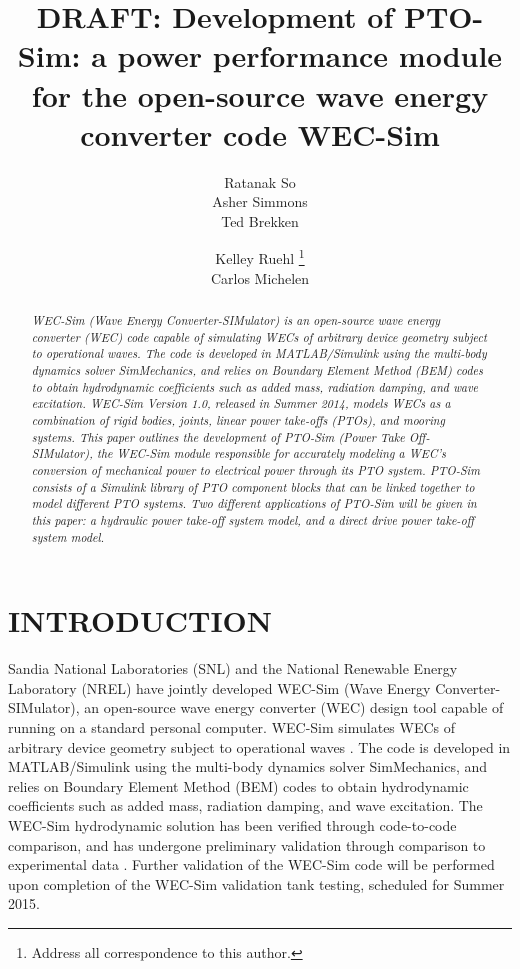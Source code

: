 \documentclass[twocolumn,10pt]{asme2e}
\title{DRAFT: Development of PTO-Sim: a power performance module for the open-source wave energy converter code WEC-Sim}
\author{Ratanak So\\
       {\tensfb Asher Simmons}   \\
       {\tensfb Ted Brekken}   
    \affiliation{
	School of Electrical Engineering and Computer Science\\
	Oregon State University\\
	Corvallis, Oregon USA\\
    }	
}
\author{Kelley Ruehl \thanks{Address all correspondence to this author.} \\
       {\tensfb Carlos Michelen}     
    \affiliation{Water Power Department \\
    	Sandia National Laboratories\\
	Albuquerque, NM USA\\
	Email: kelley.ruehl@sandia.gov
    }
}
\begin{document}
\maketitle    


\begin{abstract}
{\it 
WEC-Sim (Wave Energy Converter-SIMulator) is an open-source wave energy converter (WEC) code capable of simulating WECs of arbitrary device geometry subject to operational waves. The code is developed in MATLAB/Simulink using the multi-body dynamics solver SimMechanics, and relies on Boundary Element Method (BEM) codes to obtain hydrodynamic coefficients such as added mass, radiation damping, and wave excitation. WEC-Sim Version 1.0, released in Summer 2014, models WECs as a combination of rigid bodies, joints, linear power take-offs (PTOs), and mooring systems. This paper outlines the development of PTO-Sim (Power Take Off-SIMulator), the WEC-Sim module responsible for accurately modeling a WEC's conversion of mechanical power to electrical power through its PTO system. PTO-Sim consists of a Simulink library of PTO component blocks that can be linked together to model different PTO systems. Two different applications of PTO-Sim will be given in this paper: a hydraulic power take-off system model, and a direct drive power take-off system model.
}
\end{abstract}


\section*{INTRODUCTION}

Sandia National Laboratories (SNL) and the National Renewable Energy Laboratory (NREL) have jointly developed WEC-Sim (Wave Energy Converter-SIMulator), an open-source wave energy converter (WEC) design tool capable of running on a standard personal computer. WEC-Sim  simulates WECs of arbitrary device geometry subject to operational waves \cite{wecsim}. The code is developed in MATLAB/Simulink using the multi-body dynamics solver SimMechanics, and relies on Boundary Element Method (BEM) codes to obtain hydrodynamic coefficients such as added mass, radiation damping, and wave excitation. The WEC-Sim hydrodynamic solution has been verified through code-to-code comparison, and has undergone preliminary validation through comparison to experimental data \cite{yu2014design}\cite{lawson2014implementing} \cite{ruehl2014preliminary}\cite{yu2014development}.  
Further validation of the WEC-Sim code will be performed upon completion of the WEC-Sim validation tank testing, scheduled for Summer 2015. 
\end{document}
